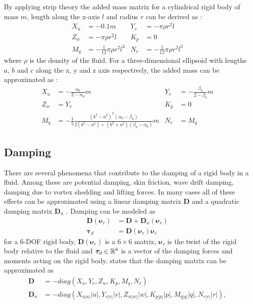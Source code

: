 By applying strip theory the added mass matrix for a cylindrical rigid body of
mass $m$, length along the x-axis $l$ and radius $r$ can be derived as \cite{fossen1994}:
\begin{align}
 X_{\dot{u}} &= -0.1 m &
 Y_{\dot{v}} &= -\pi \rho r^2 l \nonumber \\
 Z_{\dot{w}} &= -\pi \rho r^2 l &
 K_{\dot{p}} &= 0 \\
 M_{\dot{q}} &= -\frac{1}{12} \pi \rho r^2 l^3 &
 N_{\dot{r}} &= -\frac{1}{12} \pi \rho r^2 l^3 \nonumber
\end{align}
where $\rho$ is the density of the fluid. For a three-dimensional ellipsoid with
lengths $a$, $b$ and $c$ along the x, y and z axis respectively, the added mass
can be approximated as \cite{fossen2021}:
\begin{align}
 X_{\dot{u}} &= -\frac{\alpha_0}{2-\alpha_0}m &
 Y_{\dot{v}} &= -\frac{\beta_0}{2-\beta_0}m \nonumber \\
 Z_{\dot{w}} &= Y_{\dot{v}}&
 K_{\dot{p}} &= 0 \\
 M_{\dot{q}} &= -\frac{1}{5}\frac{(b^2-a^2)^2(\alpha_0-\beta_0)}{2(b^2-a^2) + (b^2+a^2)(\beta_0-\alpha_0)}m&
 N_{\dot{r}} &= M_{\dot{q}} \nonumber
\end{align}

\subsection{Damping}

There are several phenomena that contribute to the damping of a rigid body in
a fluid. Among these are potential damping, skin friction, wave drift damping,
damping due to vortex shedding and lifting forces. In many cases
all of these effects can be approximated using a linear damping matrix $\bm{D}$ and
a quadratic damping matrix $\bm{D}_n$ \cite{fossen2021}. Damping can be modeled
as
\begin{align}
    \bm{D}(\bm{\nu}_r) &= \bm{D} + \bm{D}_n(\bm{\nu}_r) \\
    \bm{\tau}_d &= \bm{D}(\bm{\nu}_r)\bm{\nu}_r
\end{align}
for a 6-DOF rigid body, $\bm{D}(\bm{\nu}_r)$ is a $6\times 6$ matrix, $\bm{\nu}_r$
is the twist of the rigid body relative to the fluid and $\bm{\tau}_d \in \mathbb{R}^6$
is a vector of the damping forces and moments acting on the rigid body. \cite{antonelli2018}
states that the damping matrix can be approximated as
\begin{subequations}
\begin{align}
    \bm{D} &= -diag(X_u, Y_v, Z_w, K_p, M_q, N_r) \\
    \bm{D}_n &= -diag(X_{u|u|}|u|, Y_{v|v|}|v|, Z_{w|w|}|w|, K_{p|p|}|p|, M_{q|q|}|q|, N_{r|r|}|r|),
\end{align}
\end{subequations}

